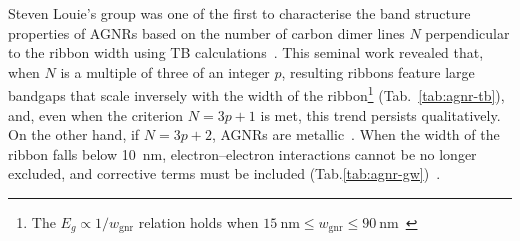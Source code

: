 Steven Louie's group was one of the first to characterise the band structure properties of \glspl{AGNR} based on the number of carbon dimer lines $N$ perpendicular to the ribbon width using \gls{TB} calculations~\cite{son2006energy}. This seminal work revealed that, when $N$ is a multiple of three of an integer $p$, resulting ribbons feature large bandgaps that scale inversely with the width of the ribbon\footnote[4]{The $E_g \propto 1/w_\text{gnr}$ relation holds when $\SI{15}{\nano\metre} \le w_\text{gnr} \le \SI{90}{\nano\metre}$~\cite{yang2007quasiparticle}} (Tab.~\ref{tab:agnr-tb}), and, even when the criterion $N=3p+1$ is met, this trend persists qualitatively. On the other hand, if $N=3p+2$, \glspl{AGNR} are metallic~\cite{nakada1996edge}. When the width of the ribbon falls below \SI{10}{\nano\metre}, electron--electron interactions cannot be no longer excluded, and corrective terms must be included (Tab.\ref{tab:agnr-gw})~\cite{yang2007quasiparticle}.


